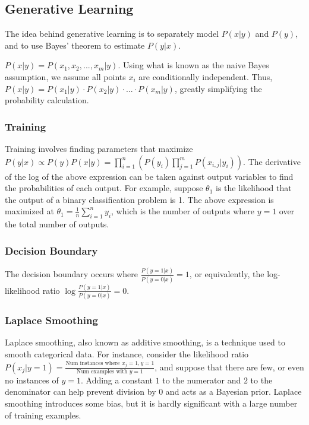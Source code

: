 \documentclass[12pt,titlepage]{article}
\begin{document}
    \subsection{Generative Learning}
      The idea behind generative learning is to separately model $P(x|y)$ and $P(y)$, and to use Bayes' theorem to estimate $P(y|x)$.

      $P(x|y) = P(x_1, x_2, ..., x_m|y)$. Using what is known as the naive Bayes assumption, we assume all points $x_i$ are conditionally independent.
      Thus, $P(x|y) = P(x_1|y) \cdot P(x_2|y) \cdot ... \cdot P(x_m|y)$, greatly simplifying the probability calculation.

      \subsubsection{Training}
        Training involves finding parameters that maximize $P(y|x) \propto P(y)P(x|y) = \prod_{i=1}^n (P(y_i) \prod_{j=1}^m P(x_{i,j}|y_i))$. The
        derivative of the log of the above expression can be taken against output variables to find the probabilities of each output. For example,
        suppose $\theta_1$ is the likelihood that the output of a binary classification problem is 1. The above expression is maximized at
        $\theta_1 = \frac{1}{n} \sum_{i=1}^n y_i$, which is the number of outputs where $y=1$ over the total number of outputs.

      \subsubsection{Decision Boundary}
        The decision boundary occurs where $\frac{P(y=1|x)}{P(y=0|x)} = 1$, or equivalently, the log-likelihood ratio $\log{\frac{P(y=1|x)}{P(y=0|x)}} = 0$.

      \subsubsection{Laplace Smoothing}
        Laplace smoothing, also known as additive smoothing, is a technique used to smooth categorical data. For instance, consider the likelihood
        ratio $P(x_j|y=1) = \frac{\text{Num instances where } x_j = 1, y = 1}{\text{Num examples with } y = 1}$, and suppose that there are few, or
        even no instances of $y = 1$. Adding a constant $1$ to the numerator and $2$ to the denominator can help prevent division by 0 and acts as
        a Bayesian prior. Laplace smoothing introduces some bias, but it is hardly significant with a large number of training examples.
\end{document}
